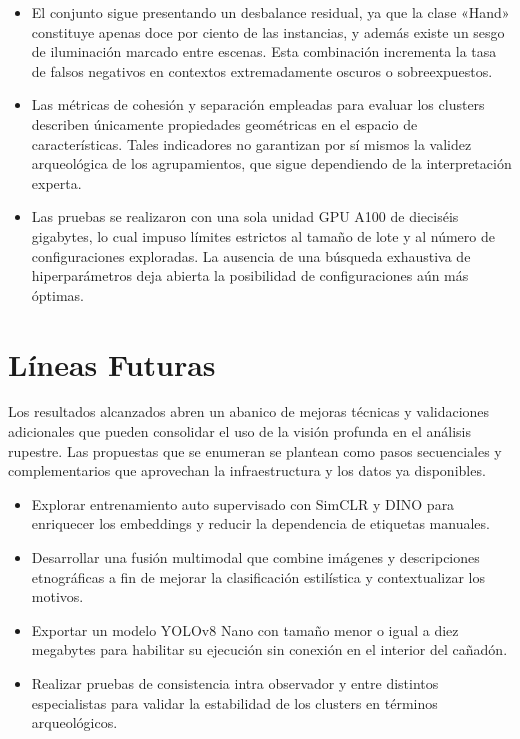 \begin{itemize}
  \item El conjunto sigue presentando un desbalance residual, ya que la clase «Hand» constituye apenas doce por ciento de las instancias, y además existe un sesgo de iluminación marcado entre escenas.
        Esta combinación incrementa la tasa de falsos negativos en contextos extremadamente oscuros o sobreexpuestos.

  \item Las métricas de cohesión y separación empleadas para evaluar los clusters describen únicamente propiedades geométricas en el espacio de características.
        Tales indicadores no garantizan por sí mismos la validez arqueológica de los agrupamientos, que sigue dependiendo de la interpretación experta.

  \item Las pruebas se realizaron con una sola unidad GPU A100 de dieciséis gigabytes, lo cual impuso límites estrictos al tamaño de lote y al número de configuraciones exploradas.
        La ausencia de una búsqueda exhaustiva de hiperparámetros deja abierta la posibilidad de configuraciones aún más óptimas.
\end{itemize}

\section{Líneas Futuras}

Los resultados alcanzados abren un abanico de mejoras técnicas y validaciones adicionales que pueden consolidar el uso de la visión profunda en el análisis rupestre.
Las propuestas que se enumeran se plantean como pasos secuenciales y complementarios que aprovechan la infraestructura y los datos ya disponibles.

\begin{itemize}
  \item Explorar entrenamiento auto supervisado con SimCLR y DINO para enriquecer los embeddings y reducir la dependencia de etiquetas manuales.
  \item Desarrollar una fusión multimodal que combine imágenes y descripciones etnográficas a fin de mejorar la clasificación estilística y contextualizar los motivos.
  \item Exportar un modelo YOLOv8 Nano con tamaño menor o igual a diez megabytes para habilitar su ejecución sin conexión en el interior del cañadón.
  \item Realizar pruebas de consistencia intra observador y entre distintos especialistas para validar la estabilidad de los clusters en términos arqueológicos.
\end{itemize}

